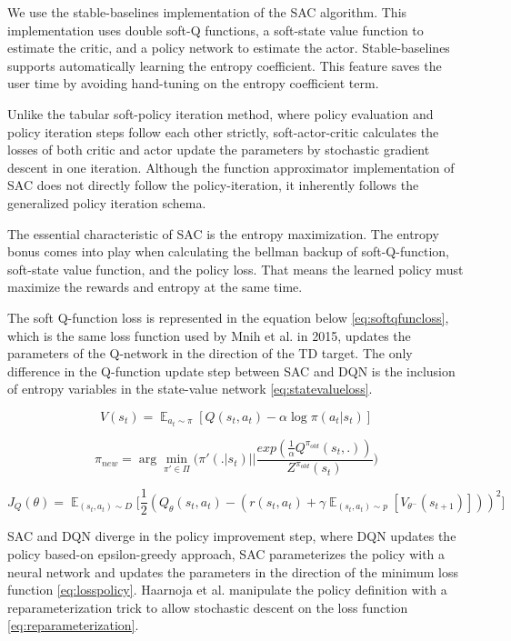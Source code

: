 We use the stable-baselines implementation of the SAC algorithm. This implementation uses double soft-Q functions, a soft-state value function to estimate the critic, and a policy network to estimate the actor. Stable-baselines supports automatically learning the entropy coefficient. This feature saves the user time by avoiding hand-tuning on the entropy coefficient term.

Unlike the tabular soft-policy iteration method, where policy evaluation and policy iteration steps follow each other strictly, soft-actor-critic calculates the losses of both critic and actor update the parameters by stochastic gradient descent in one iteration. Although the function approximator implementation of SAC does not directly follow the policy-iteration, it inherently follows the generalized policy iteration schema. 

The essential characteristic of SAC is the entropy maximization. The entropy bonus comes into play when calculating the bellman backup of soft-Q-function, soft-state value function, and the policy loss. That means the learned policy must maximize the rewards and entropy at the same time. 

The soft Q-function loss is represented in the equation below \ref{eq:softqfuncloss}, which is the same loss function used by Mnih et al. in 2015, updates the parameters of the Q-network in the direction of the TD target. The only difference in the Q-function update step between SAC and DQN is the inclusion of entropy variables in the state-value network \ref{eq:statevalueloss}.

\begin{equation}
    V(s_t) = \mathop{\mathbb{E}}_{a_t \sim \pi}[Q(s_t,a_t)- \alpha \log \pi(a_t|s_t)]
    \label{eq:statevalueloss} 
\end{equation} 

\begin{equation}
    \pi_{new} = \arg\min\limits_{\pi' \in \Pi} \Bigg(\pi'(.|s_t) \Bigg|\Bigg| \frac{exp(\frac{1}{\alpha} Q^{\pi_{old}}(s_t,.))}{Z^{\pi_{old}}(s_t)} \Bigg)
\end{equation}

\begin{equation}
    J_Q(\theta) = \mathop{\mathbb{E}}_{(s_t,a_t)\sim D} \Big[ \frac{1}{2}(Q_{\theta}(s_t,a_t)-(r(s_t,a_t) + \gamma \mathop{\mathbb{E}}_{(s_t,a_t)\sim p}[V_{\theta^-}(s_{t+1})]))^2 \Big]
    \label{eq:softqfuncloss}
\end{equation}

SAC and DQN diverge in the policy improvement step, where DQN updates the policy based-on epsilon-greedy approach, SAC parameterizes the policy with a neural network and updates the parameters in the direction of the minimum loss function \ref{eq:losspolicy}. Haarnoja et al. manipulate the policy definition with a reparameterization trick to allow stochastic descent on the loss function \ref{eq:reparameterization}.

